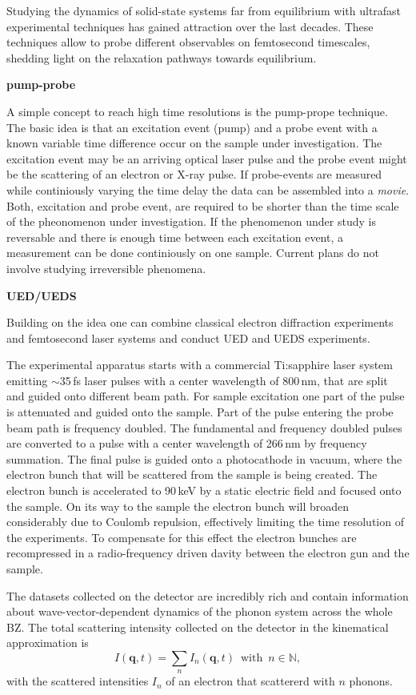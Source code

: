 Studying the dynamics of solid-state systems far from equilibrium with ultrafast experimental techniques has gained attraction over the last decades.
These techniques allow to probe different observables on femtosecond timescales, shedding light on the relaxation pathways towards equilibrium.

\textbf{pump-probe}

A simple concept to reach high time resolutions is the pump-prope technique.
The basic idea is that an excitation event (pump) and a probe event with a known variable time difference occur on the sample under investigation.
The excitation event may be an arriving optical laser pulse and the probe event might be the scattering of an electron or X-ray pulse.
If probe-events are measured while continiously varying the time delay the data can be assembled into a \emph{movie}.
Both, excitation and probe event, are required to be shorter than the time scale of the pheonomenon under investigation.
If the phenomenon under study is reversable and there is enough time between each excitation event, a measurement can be done continiously on one sample.
Current plans do not involve studying irreversible phenomena.

\textbf{UED/UEDS}

Building on the idea one can combine classical electron diffraction experiments and femtosecond laser systems and conduct \ac{UED} and \ac{UEDS} experiments.

The experimental apparatus starts with a commercial Ti:sapphire laser system emitting $\sim$35\,fs laser pulses with a center wavelength of 800\,nm, that are split and guided onto different beam path.
For sample excitation one part of the pulse is attenuated and guided onto the sample.
Part of the pulse entering the probe beam path is frequency doubled. The fundamental and frequency doubled pulses are converted to a pulse with a center wavelength of 266\,nm by frequency summation.
The final pulse is guided onto a photocathode in vacuum, where the electron bunch that will be scattered from the sample is being created.
The electron bunch is accelerated to 90\,keV by a static electric field and focused onto the sample.
On its way to the sample the electron bunch will broaden considerably due to Coulomb repulsion, effectively limiting the time resolution of the experiments.
To compensate for this effect the electron bunches are recompressed in a radio-frequency driven davity between the electron gun and the sample.

The datasets collected on the detector are incredibly rich and contain information about wave-vector-dependent dynamics of the phonon system across the whole \ac{BZ}.
The total scattering intensity collected on the detector in the kinematical approximation is
\[ I(\mathbf{q},t) = \sum_n I_n(\mathbf{q},t)\enspace\text{with}\enspace n \in\mathbb{N},\]
with the scattered intensities $I_n$ of an electron that scattererd with $n$ phonons.

